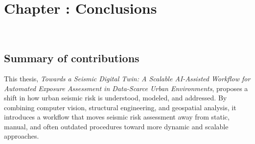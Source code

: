 \graphicspath{{figures_and_references/EELISA_conference/}}

\renewcommand{\chapternametext}{Chapter \thechapter: Conclusions}

\chapter{\chapternametext}
\

\renewcommand{\headingtextL}{}
\renewcommand{\headingtextR}{\chapternametext}
\begingroup
 \flushbottom
 \setlength{\parskip}{0pt plus 1fil}%
 \localtableofcontents 
\endgroup


\newpage

\setcounter{section}{0} 



\FloatBarrier

\renewcommand{\sectionnametext}{Summary of contributions}
\renewcommand{\headingtextL}{\chapternametext}
\renewcommand{\headingtextR}{\thesection. \sectionnametext}
\section{\sectionnametext}

This thesis, \textit{Towards a Seismic Digital Twin: A Scalable AI-Assisted Workflow for Automated Exposure Assessment in Data-Scarce Urban Environments}, proposes a shift in how urban seismic risk is understood, modeled, and addressed. By combining computer vision, structural engineering, and geospatial analysis, it introduces a workflow that moves seismic risk assessment away from static, manual, and often outdated procedures toward more dynamic and scalable approaches.

